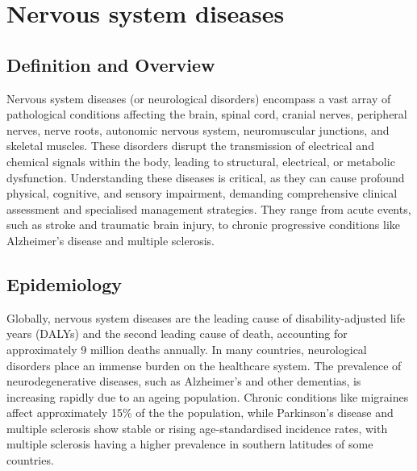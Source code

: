 \chapter{Nervous system diseases}

\section*{Definition and Overview}
Nervous system diseases (or neurological disorders) encompass a vast array of pathological conditions affecting the brain, spinal cord, cranial nerves, peripheral nerves, nerve roots, autonomic nervous system, neuromuscular junctions, and skeletal muscles. These disorders disrupt the transmission of electrical and chemical signals within the body, leading to structural, electrical, or metabolic dysfunction. Understanding these diseases is critical, as they can cause profound physical, cognitive, and sensory impairment, demanding comprehensive clinical assessment and specialised management strategies. They range from acute events, such as stroke and traumatic brain injury, to chronic progressive conditions like Alzheimer's disease and multiple sclerosis.

\section*{Epidemiology}
Globally, nervous system diseases are the leading cause of disability-adjusted life years (DALYs) and the second leading cause of death, accounting for approximately 9 million deaths annually. In many countries, neurological disorders place an immense burden on the healthcare system. The prevalence of neurodegenerative diseases, such as Alzheimer's and other dementias, is increasing rapidly due to an ageing population. Chronic conditions like migraines affect approximately 15\% of the the population, while Parkinson's disease and multiple sclerosis show stable or rising age-standardised incidence rates, with multiple sclerosis having a higher prevalence in southern latitudes of some countries.

